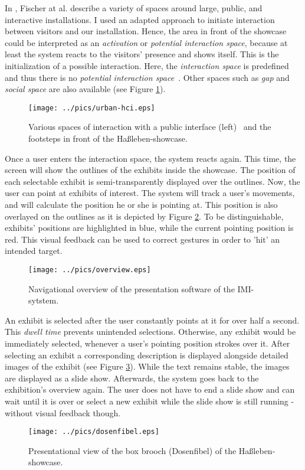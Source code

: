 In \cite{UrbanHCI}, Fischer at al. describe a variety of spaces around large, public, and interactive installations. I used an adapted approach to initiate interaction between visitors and our installation. Hence, the area in front of the showcase could be interpreted as an \textit{activation} or \textit{potential interaction space}, because at least the system reacts to the visitors' presence and shows itself. This is the initialization of a possible interaction. Here, the \textit{interaction space} is predefined and thus there is no \textit{potential interaction space}~\cite{UrbanHCI}. Other spaces such as \textit{gap} and \textit{social space} are also available (see Figure \ref{fig:uhci_hassleben}). 
\begin{figure}[H]%
\texttt{[image: ../pics/urban-hci.eps]}%
\caption{Various spaces of interaction with a public interface (left)~\cite{UrbanHCI} and the footsteps in front of the Haßleben-showcase.}%
\label{fig:uhci_hassleben}%
\end{figure}

Once a user enters the interaction space, the system reacts again. This time, the screen will show the outlines of the exhibits inside the showcase. The position of each selectable exhibit is semi-transparently displayed over the outlines. Now, the user can point at exhibits of interest. The system will track a user's movements, and will calculate the position he or she is pointing at. This position is also overlayed on the outlines as it is depicted by Figure \ref{fig:sketch}. To be distinguishable, exhibits' positions are  highlighted in blue, while the current pointing position is red. This visual feedback can be used to correct gestures in order to 'hit' an intended target.
\begin{figure}[H]%
\texttt{[image: ../pics/overview.eps]}%
\caption{Navigational overview of the presentation software of the \ac{IMI}-sytstem.}%
\label{fig:sketch}%
\end{figure}

An exhibit is selected after the user constantly points at it for over half a second. This \textit{dwell time} prevents unintended selections. Otherwise, any exhibit would be immediately selected, whenever a user's pointing position strokes over it. After selecting an exhibit a corresponding description is displayed alongside detailed images of the exhibit (see Figure \ref{fig:show}). While the text remains stable, the images are displayed as a slide show. Afterwards, the system goes back to the exhibition's overview again. The user does not have to end a slide show and can wait until it is over or select a new exhibit while the slide show is still running - without visual feedback though.
\begin{figure}[H]%
\texttt{[image: ../pics/dosenfibel.eps]}%
\caption{Presentational view of the box brooch (Dosenfibel) of the Haßleben-showcase.}%
\label{fig:show}%
\end{figure}

